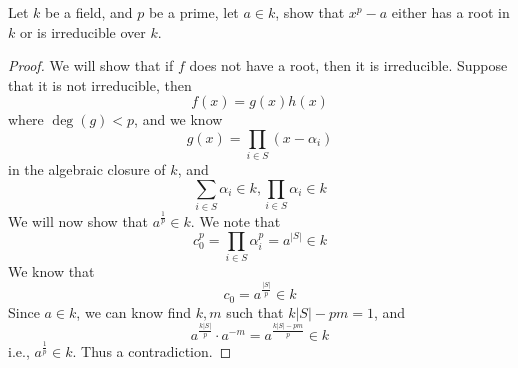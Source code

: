 \begin{prob}[S2006-Q4]
    Let $k$ be a field, and $p$ be a prime, let $a\in k$, show that $x^p-a$ either has a root in $k$ or is irreducible over $k$.
\end{prob}
\begin{proof}
    We will show that if $f$ does not have a root, then it is irreducible. Suppose that it is not irreducible, then 
    \begin{equation*}
        f(x)=g(x)h(x)
    \end{equation*}
    where $\deg(g)<p$, and we know 
    \begin{equation*}
        g(x)=\prod_{i\in S}(x-\alpha_i)
    \end{equation*}
    in the algebraic closure of $k$, and 
    \begin{equation*}
        \sum_{i\in S}\alpha_i\in k, \prod_{i\in S}\alpha_i\in k
    \end{equation*}
    We will now show that $a^\frac{1}{p}\in k$. We note that 
    \begin{equation*}
        c_0^p=\prod_{i\in S}\alpha_i^p=a^{|S|}\in k
    \end{equation*}
    We know that 
    \begin{equation*}
        c_0=a^\frac{|S|}{p}\in k
    \end{equation*}
    Since $a\in k$, we can know find $k, m$ such that $k|S|-pm=1$, and 
    \begin{equation*}
        a^\frac{k|S|}{p}\cdot a^{-m}=a^{\frac{k|S|-pm}{p}}\in k
    \end{equation*}
    i.e., $a^\frac{1}{p}\in k$. Thus a contradiction.
\end{proof}



